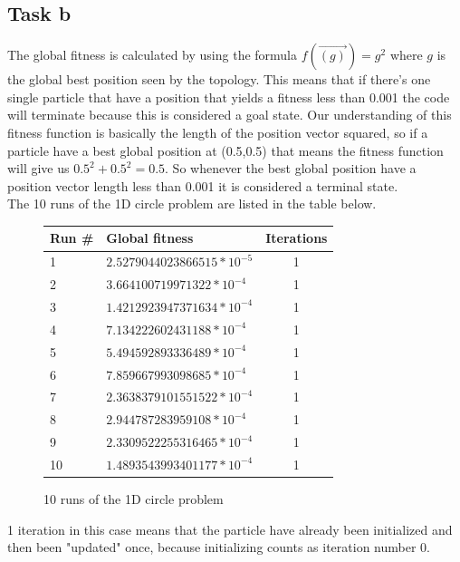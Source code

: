 \documentclass[12pt, a4paper]{article}
\begin{document}
\subsection{Task b}
The global fitness is calculated by using the formula $f(\vec{(g)})=g^2$ where $g$ is the global best position seen by the topology. This means that if there's one single particle that have a position that yields a fitness less than 0.001 the code will terminate because this is considered a goal state. Our understanding of this fitness function is basically the length of the position vector squared, so if a particle have a best global position at (0.5,0.5) that means the fitness function will give us $0.5^2 + 0.5^2 = 0.5$. So whenever the best global position have a position vector length less than 0.001 it is considered a terminal state.\\
The 10 runs of the 1D circle problem are listed in the table below.
\begin{figure}[H]
\begin{center}
\begin{tabular}{l| l  c}
Run \# & Global fitness& Iterations\\ \hline
1&$2.5279044023866515*10^{-5}$ & 1 \\
2&$3.664100719971322*10^{-4}$ & 1 \\
3&$1.4212923947371634*10^{-4}$ & 1 \\
4&$7.134222602431188*10^{-4}$ & 1 \\
5&$5.494592893336489*10^{-4}$ & 1 \\
6&$7.859667993098685*10^{-4}$ & 1 \\
7&$2.3638379101551522*10^{-4}$ & 1 \\
8&$2.944787283959108*10^{-4}$ & 1 \\
9&$2.3309522255316465*10^{-4}$ & 1 \\
10&$1.4893543993401177*10^{-4}$ & 1 \\
\end{tabular}
\caption{10 runs of the 1D circle problem}
\end{center}
\end{figure}
1 iteration in this case means that the particle have already been initialized and then been "updated" once, because initializing counts as iteration number 0.
\end{document}
